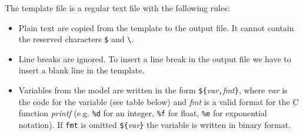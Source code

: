 The template file is a regular text file with the following rules:
\begin{itemize}
\item Plain text are copied from the template to the output file. It cannot contain 
the reserved characters {\tt \$} and {\tt \textbackslash}.
\item Line breaks are ignored. To insert a line break in the output file we have to insert
a blank line in the template.
\item Variables from the model are written in the form 
\mbox{{\tt \$\{}{\it var}{\tt ,}{\it fmt}{\tt \}}}, where {\it var} is the code for the
variable (see table below) and {\it fmt} is a valid format for the C function {\it printf} 
(e.g. {\tt \%d} for an integer, {\tt \%f} for float, {\tt \%e} for exponential notation).
If {\tt fmt} is omitted {\tt\$\{}{\it var}{\tt \}} the variable is written in binary format.
\end{itemize}
